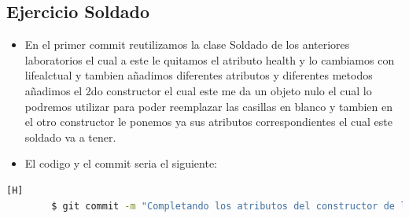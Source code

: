 \documentclass{article}
\begin{document}
	\subsection{Ejercicio Soldado}
	\begin{itemize}	
		\item En el primer commit reutilizamos la clase Soldado de los anteriores laboratorios el cual a este le quitamos el atributo health y lo cambiamos con lifealctual y tambien añadimos diferentes atributos y diferentes metodos añadimos el 2do constructor el cual este me da un objeto nulo el cual lo podremos utilizar para poder reemplazar las casillas en blanco y tambien en el otro constructor le ponemos ya sus atributos correspondientes el cual este soldado va a tener.
		\item El codigo y el commit seria el siguiente:
	\end{itemize}	
	\begin{lstlisting}[language=bash,caption={Commit}][H]
		$ git commit -m "Completando los atributos del constructor de la clase Soldado() el cual este va a ser para cuando el objeto sea nulo"
	\end{lstlisting}	
\end{document}
